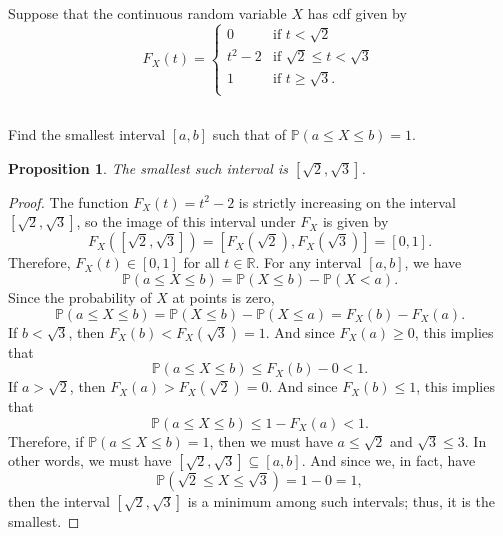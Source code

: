 \documentclass[12pt]{article}
\newenvironment{problem}
    {\begin{lrbox}{\mybox}\begin{minipage}{0.98\textwidth}}
    {\end{minipage}\end{lrbox}\framebox[\textwidth]{\usebox{\mybox}}}
\newtheorem{proposition}{Proposition}
\newcommand{\R}{\mathbb{R}}
\renewcommand{\P}{\mathbb{P}}
\begin{document}
\newpage
\section{}
\begin{problem}
    Suppose that the continuous random variable $X$ has cdf given by
    \[
        F_X(t) = \begin{cases}
            0 & \text{if $t < \sqrt{2}$} \\
            t^2 - 2 & \text{if $\sqrt{2} \leq t < \sqrt{3}$} \\
            1 & \text{if $t \geq \sqrt{3}$}. \\
        \end{cases}
    \]
\end{problem}
\medskip

\subsection{}
\begin{problem}
    Find the smallest interval $[a, b]$ such that of $\P(a \leq X \leq b) = 1$.
\end{problem}

\begin{proposition}
    The smallest such interval is $[\sqrt{2}, \sqrt{3}]$.
\end{proposition}

\begin{proof}
    The function $F_X(t) = t^2 - 2$ is strictly increasing on the interval $[\sqrt{2}, \sqrt{3}]$, so the image of this interval under $F_X$ is given by
    \[
        F_X\left([\sqrt{2}, \sqrt{3}]\right) = \left[F_X(\sqrt{2}), F_X(\sqrt{3})\right] = [0, 1].
    \]
    Therefore, $F_X(t) \in [0, 1]$ for all $t \in \R$. For any interval $[a, b]$, we have
    \[
        \P(a \leq X \leq b) = \P(X \leq b) - \P(X < a).
    \]
    Since the probability of $X$ at points is zero,
    \[
        \P(a \leq X \leq b) = \P(X \leq b) - \P(X \leq a) = F_X(b) - F_X(a).
    \]
    If $b < \sqrt{3}$, then $F_X(b) < F_X(\sqrt{3}) = 1$. And since $F_X(a) \geq 0$, this implies that
    \[
        \P(a \leq X \leq b) \leq F_X(b) - 0 < 1.
    \]
    If $a > \sqrt{2}$, then $F_X(a) > F_X(\sqrt{2}) = 0$. And since $F_X(b) \leq 1$, this implies that
    \[
        \P(a \leq X \leq b) \leq 1 - F_X(a) < 1.
    \]
    Therefore, if $\P(a \leq X \leq b) = 1$, then we must have $a \leq \sqrt{2}$ and $\sqrt{3} \leq 3$. In other words, we must have $[\sqrt{2}, \sqrt{3}] \subseteq [a, b]$. And since we, in fact, have
    \[
        \P(\sqrt{2} \leq X \leq \sqrt{3}) = 1 - 0 = 1,
    \]
    then the interval $[\sqrt{2}, \sqrt{3}]$ is a minimum among such intervals; thus, it is the smallest.
     
\end{proof}
\end{document}
